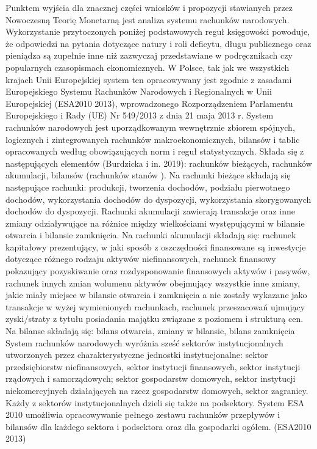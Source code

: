 \documentclass[
]{book}
\begin{document}
Punktem wyjścia dla znacznej części wniosków i propozycji stawianych przez Nowoczesną Teorię Monetarną jest analiza systemu rachunków narodowych. Wykorzystanie przytoczonych poniżej podstawowych reguł księgowości powoduje, że odpowiedzi na pytania dotyczące natury i roli deficytu, długu publicznego oraz pieniądza są zupełnie inne niż zazwyczaj przedstawiane w podręcznikach czy popularnych czasopismach ekonomicznych.
W Polsce, tak jak we wszystkich krajach Unii Europejskiej system ten opracowywany jest zgodnie z zasadami Europejskiego Systemu Rachunków Narodowych i Regionalnych w Unii Europejskiej (ESA2010 2013), wprowadzonego Rozporządzeniem Parlamentu Europejskiego i Rady (UE) Nr 549/2013 z dnia 21 maja 2013 r.
System rachunków narodowych jest uporządkowanym wewnętrznie zbiorem spójnych, logicznych i zintegrowanych rachunków makroekonomicznych, bilansów i tablic opracowanych według obowiązujących norm i reguł statystycznych. Składa się z następujących elementów (Burdzicka i in. 2019):
rachunków bieżących,
rachunków akumulacji,
bilansów (rachunków stanów ).
Na rachunki bieżące składają się następujące rachunki:
produkcji,
tworzenia dochodów,
podziału pierwotnego dochodów,
wykorzystania dochodów do dyspozycji,
wykorzystania skorygowanych dochodów do dyspozycji.
Rachunki akumulacji zawierają transakcje oraz inne zmiany odziaływujące na różnice między wielkościami występującymi w bilansie otwarcia i bilansie zamknięcia.
Na rachunki akumulacji składają się:
rachunek kapitałowy prezentujący, w jaki sposób z oszczędności finansowane są inwestycje dotyczące różnego rodzaju aktywów niefinansowych,
rachunek finansowy pokazujący pozyskiwanie oraz rozdysponowanie finansowych aktywów i pasywów,
rachunek innych zmian wolumenu aktywów obejmujący wszystkie inne zmiany, jakie miały miejsce w bilansie otwarcia i zamknięcia a nie zostały wykazane jako transakcje w wyżej wymienionych rachunkach,
rachunek przeszacowań ujmujący zyski/straty z tytułu posiadania majątku związane z poziomem i strukturą cen.
Na bilanse składają się:
bilans otwarcia,
zmiany w bilansie,
bilans zamknięcia
System rachunków narodowych wyróżnia sześć sektorów instytucjonalnych utworzonych przez charakterystyczne jednostki instytucjonalne:
sektor przedsiębiorstw niefinansowych,
sektor instytucji finansowych,
sektor instytucji rządowych i samorządowych;
sektor gospodarstw domowych,
sektor instytucji niekomercyjnych działających na rzecz gospodarstw domowych,
sektor zagranicy.
Każdy z sektorów instytucjonalnych dzieli się także na podsektory. System ESA 2010 umożliwia opracowywanie pełnego zestawu rachunków przepływów i bilansów dla każdego sektora i podsektora oraz dla gospodarki ogółem. (ESA2010 2013)
\end{document}
